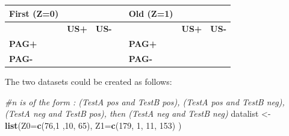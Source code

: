 \documentclass[
]{book}
\newenvironment{Shaded}{\begin{snugshade}}{\end{snugshade}}
\newcommand{\AttributeTok}[1]{\textcolor[rgb]{0.13,0.29,0.53}{#1}}
\newcommand{\CommentTok}[1]{\textcolor[rgb]{0.56,0.35,0.01}{\textit{#1}}}
\newcommand{\DecValTok}[1]{\textcolor[rgb]{0.00,0.00,0.81}{#1}}
\newcommand{\FunctionTok}[1]{\textcolor[rgb]{0.13,0.29,0.53}{\textbf{#1}}}
\newcommand{\NormalTok}[1]{#1}
\newcommand{\OtherTok}[1]{\textcolor[rgb]{0.56,0.35,0.01}{#1}}
\begin{document}
\begin{longtable}[]{@{}
  >{\centering\arraybackslash}p{}
  >{\centering\arraybackslash}p{}
  >{\centering\arraybackslash}p{}
  >{\centering\arraybackslash}p{}
  >{\centering\arraybackslash}p{}
  >{\centering\arraybackslash}p{}
  >{\centering\arraybackslash}p{}@{}}
\toprule\noalign{}
\begin{minipage}[b]{\linewidth}\centering
\textbf{First (Z=0)}
\end{minipage} & \begin{minipage}[b]{\linewidth}\centering
\end{minipage} & \begin{minipage}[b]{\linewidth}\centering
\end{minipage} & \begin{minipage}[b]{\linewidth}\centering
\end{minipage} & \begin{minipage}[b]{\linewidth}\centering
\textbf{Old (Z=1)}
\end{minipage} & \begin{minipage}[b]{\linewidth}\centering
\end{minipage} & \begin{minipage}[b]{\linewidth}\centering
\end{minipage} \\
\midrule\noalign{}
\endhead
\bottomrule\noalign{}
\endlastfoot
& \textbf{US+} & \textbf{US-} & & & \textbf{US+} & \textbf{US-} \\
\textbf{PAG+} & 76 & 10 & & \textbf{PAG+} & 179 & 11 \\
\textbf{PAG-} & 1 & 65 & & \textbf{PAG-} & 1 & 153 \\
\end{longtable}

The two datasets could be created as follows:

\begin{Shaded}
\begin{Highlighting}[]
\CommentTok{\#n is of the form : (TestA pos and TestB pos), (TestA pos and TestB neg), (TestA neg and TestB pos), then (TestA neg and TestB neg)}
\NormalTok{datalist }\OtherTok{\textless{}{-}} \FunctionTok{list}\NormalTok{(}\AttributeTok{Z0=}\FunctionTok{c}\NormalTok{(}\DecValTok{76}\NormalTok{,}\DecValTok{1}\NormalTok{ ,}\DecValTok{10}\NormalTok{, }\DecValTok{65}\NormalTok{),}
                 \AttributeTok{Z1=}\FunctionTok{c}\NormalTok{(}\DecValTok{179}\NormalTok{, }\DecValTok{1}\NormalTok{, }\DecValTok{11}\NormalTok{, }\DecValTok{153}\NormalTok{)}
\NormalTok{                 )}
\end{Highlighting}
\end{Shaded}
\end{document}
